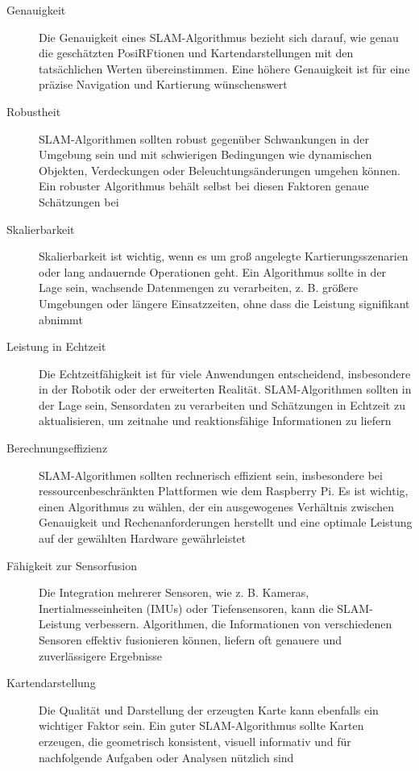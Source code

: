 \begin{description}
    \item[Genauigkeit]{Die Genauigkeit eines \ac{SLAM}-Algorithmus bezieht sich darauf, wie genau die geschätzten PosiRFtionen und Kartendarstellungen mit den tatsächlichen Werten übereinstimmen. Eine höhere Genauigkeit ist für eine präzise Navigation und Kartierung wünschenswert}
    \item[Robustheit]{\ac{SLAM}-Algorithmen sollten robust gegenüber Schwankungen in der Umgebung sein und mit schwierigen Bedingungen wie dynamischen Objekten, Verdeckungen oder Beleuchtungsänderungen umgehen können. Ein robuster Algorithmus behält selbst bei diesen Faktoren genaue Schätzungen bei} 
    \item[Skalierbarkeit]{Skalierbarkeit ist wichtig, wenn es um groß angelegte Kartierungsszenarien oder lang andauernde Operationen geht. Ein Algorithmus sollte in der Lage sein, wachsende Datenmengen zu verarbeiten, z. B. größere Umgebungen oder längere Einsatzzeiten, ohne dass die Leistung signifikant abnimmt}
    \item[Leistung in Echtzeit]{Die Echtzeitfähigkeit ist für viele Anwendungen entscheidend, insbesondere in der Robotik oder der erweiterten Realität. \ac{SLAM}-Algorithmen sollten in der Lage sein, Sensordaten zu verarbeiten und Schätzungen in Echtzeit zu aktualisieren, um zeitnahe und reaktionsfähige Informationen zu liefern}
    \item[Berechnungseffizienz]{\ac{SLAM}-Algorithmen sollten rechnerisch effizient sein, insbesondere bei ressourcenbeschränkten Plattformen wie dem Raspberry Pi. Es ist wichtig, einen Algorithmus zu wählen, der ein ausgewogenes Verhältnis zwischen Genauigkeit und Rechenanforderungen herstellt und eine optimale Leistung auf der gewählten Hardware gewährleistet}
    \item[Fähigkeit zur Sensorfusion]{Die Integration mehrerer Sensoren, wie z. B. Kameras, Inertialmesseinheiten (IMUs) oder Tiefensensoren, kann die \ac{SLAM}-Leistung verbessern. Algorithmen, die Informationen von verschiedenen Sensoren effektiv fusionieren können, liefern oft genauere und zuverlässigere Ergebnisse}
    \item[Kartendarstellung]{Die Qualität und Darstellung der erzeugten Karte kann ebenfalls ein wichtiger Faktor sein. Ein guter \ac{SLAM}-Algorithmus sollte Karten erzeugen, die geometrisch konsistent, visuell informativ und für nachfolgende Aufgaben oder Analysen nützlich sind} 
\end{description}

